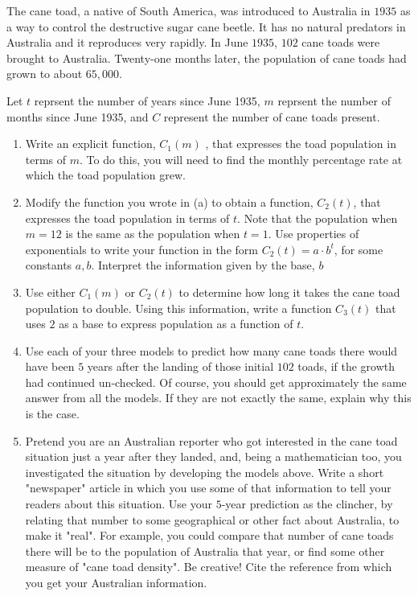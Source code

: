 \documentclass[10pt,]{book}
\theoremstyle{ptxdefinitionnotitle}
\theoremstyle{ptxdefinitiontitle}
\theoremstyle{ptxdefinitionnotitle}
\theoremstyle{ptxdefinitiontitle}
\theoremstyle{ptxdefinitionnotitle}
\theoremstyle{ptxdefinitiontitle}
\numberwithin{equation}{section}
\begin{document}
\begin{divisionexercise}{11}\hypertarget{exercise-72}{}
\hypertarget{p-270}{}%
The cane toad, a native of South America, was introduced to Australia in \(1935\) as a way to control the destructive sugar cane beetle.  It has no natural predators in Australia and it reproduces very rapidly.  In June \(1935\), \(102\) cane toads were brought to Australia.  Twenty-one months later, the population of cane toads had grown to about \(65,000\).%
\par
\hypertarget{p-271}{}%
Let \(t\) reprsent the number of years since June 1935, \(m\) reprsent the number of months since June 1935, and \(C\) represent the number of cane toads present.%
\leavevmode%
\begin{enumerate}[label=(\alph*)]
\item\hypertarget{li-167}{}Write an explicit function, \(C_1(m)\) , that expresses the toad population in terms of \(m\). To do this, you will need to find the monthly percentage rate at which the toad population grew.%
\item\hypertarget{li-168}{}Modify the function you wrote in (a) to obtain a function,  \(C_2(t)\), that expresses the toad population in terms of \(t\). Note that the population when \(m = 12\) is the same as the population when \(t = 1\).  Use properties of exponentials to write your function in the form \(C_2(t)=a \cdot b^t\), for some constants \(a, b\).  Interpret the information given by the base, \(b\)%
\item\hypertarget{li-169}{}Use either  \(C_1(m)\)  or \(C_2(t)\) to determine how long it takes the cane toad population to double.  Using this information, write a function \(C_3(t)\) that uses \(2\) as a base to express population as a function of \(t\).%
\item\hypertarget{li-170}{}Use each of your three models to predict how many cane toads there would have been \(5\) years after the landing of those initial \(102\) toads, if the growth had continued un-checked.  Of course, you should get approximately the same answer from all the models.  If they are not exactly the same, explain why this is the case.%
\item\hypertarget{li-171}{}Pretend you are an Australian reporter who got interested in the cane toad situation just a year after they landed, and, being a mathematician too, you investigated the situation by developing the models above.  Write a short "newspaper" article in which you use some of that information to tell your readers about this situation.  Use your \(5\)-year prediction as the clincher, by relating that number to some geographical or other fact about Australia, to make it "real".  For example, you could compare that number of cane toads there will be to the population of Australia that year, or find some other measure of "cane toad density".  Be creative!  Cite the reference from which you get your Australian information.%
\end{enumerate}
\end{divisionexercise}%
\typeout{************************************************}
\typeout{************************************************}
\end{document}
